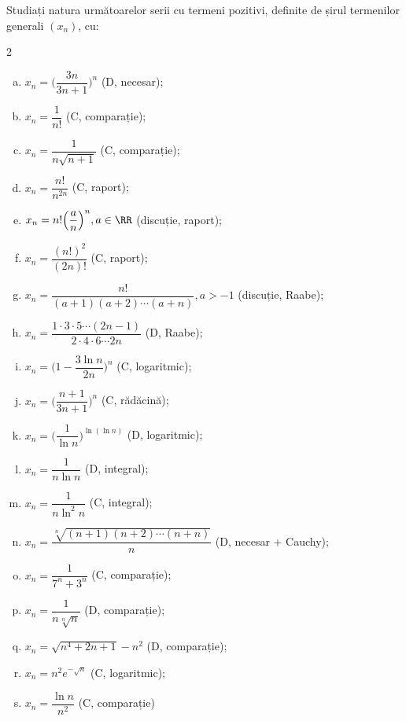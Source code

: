 Studiați natura următoarelor serii cu termeni pozitivi, definite de șirul
termenilor generali $ (x_n) $, cu:
\begin{multicols}{2}
  \begin{enumerate}[(a)]
  \item $ x_n = \Big( \dfrac{3n}{3n + 1} \Big)^n $ (D, necesar);
  \item $ x_n = \dfrac{1}{n!} $ (C, comparație);
  \item $ x_n = \dfrac{1}{n \sqrt{n+1}} $ (C, comparație);
  \item $ x_n = \dfrac{n!}{n^{2n}}$ (C, raport);
  \item $ x_n = n! \Big( \dfrac{a}{n} \Big)^n, a \in \RR $ (discuție, raport);
  \item $ x_n = \dfrac{(n!)^2}{(2n)!} $ (C, raport);
  \item $ x_n = \dfrac{n!}{(a + 1)(a+2) \cdots (a+n)}, a > -1 $ (dis\-cu\-ți\-e, Raabe);
  \item $ x_n = \dfrac{1 \cdot 3 \cdot 5 \cdots (2n - 1)}{2 \cdot 4 \cdot 6 \cdots 2n} $ (D, Raabe);
  \item $ x_n = \Big( 1 - \dfrac{3\ln n}{2n} \Big)^n $ (C, logaritmic);
  \item $ x_n = \Big( \dfrac{n + 1}{3n + 1} \Big)^n $ (C, rădăcină);
  \item $ x_n = \Big( \dfrac{1}{\ln n} \Big)^{\ln(\ln n)} $ (D, logaritmic);
  \item $ x_n = \dfrac{1}{n \ln n} $ (D, integral);
  \item $ x_n = \dfrac{1}{n \ln^2 n} $ (C, integral);
  \item $ x_n = \dfrac{\sqrt[n]{(n+1)(n+2) \cdots (n + n)}}{n} $ (D, necesar + Cauchy);
  \item $ x_n = \dfrac{1}{7^n + 3^n} $ (C, comparație);
  \item $ x_n = \dfrac{1}{n \sqrt[n]{n}} $ (D, comparație);
  \item $ x_n = \sqrt{n^4 + 2n + 1} - n^2 $ (D, comparație);
  \item $ x_n = n^2 e^{-\sqrt{n}} $ (C, logaritmic);
  \item $ x_n = \dfrac{\ln n}{n^2} $ (C, comparație)
  \end{enumerate}
\end{multicols}
